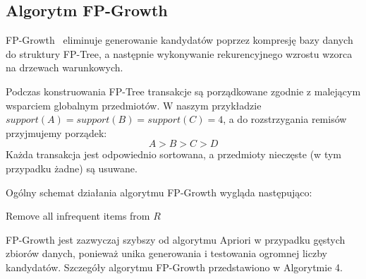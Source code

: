 \subsection{Algorytm FP-Growth}
FP-Growth~\cite{han2000mining} eliminuje generowanie kandydatów poprzez kompresję bazy danych do struktury FP-Tree, a następnie wykonywanie rekurencyjnego wzrostu wzorca na drzewach warunkowych.

Podczas konstruowania FP-Tree transakcje są porządkowane zgodnie z malejącym wsparciem globalnym przedmiotów. W naszym przykładzie $support(A) = support(B) = support(C) = 4$, a do rozstrzygania remisów przyjmujemy porządek:
\begin{equation}
A > B > C > D
\end{equation}
Każda transakcja jest odpowiednio sortowana, a przedmioty nieczęste (w tym przypadku żadne) są usuwane.

Ogólny schemat działania algorytmu FP-Growth wygląda następująco:


\begin{algorithm}[!htb]
\LinesNumbered
{}
\BlankLine
Remove all infrequent items from $R$ \;
\caption{\textbf{FP-Growth} Algorytm}
\label{alg:fpgrowth}
\end{algorithm}


FP-Growth jest zazwyczaj szybszy od algorytmu Apriori w przypadku gęstych zbiorów danych, ponieważ unika generowania i testowania ogromnej liczby kandydatów. Szczegóły algorytmu FP-Growth przedstawiono w Algorytmie 4.



